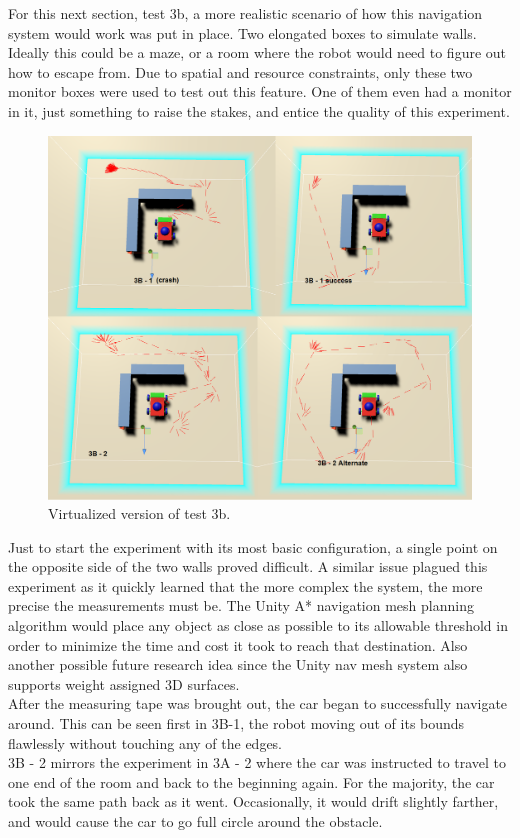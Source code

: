 \documentclass[10pt,a4paper]{article}
\begin{document}
	For this next section, test 3b, a more realistic scenario of how this navigation system would work was put in place. Two elongated boxes to simulate walls. Ideally this could be a maze, or a room where the robot would need to figure out how to escape from. Due to spatial and resource constraints, only these two monitor boxes were used to test out this feature. One of them even had a monitor in it, just something to raise the stakes, and entice the quality of this experiment.
	
	\begin{figure}
		\centering
		\includegraphics[width=.8\textwidth]{Test3_Visuals/Test3b_mosaic.png}
		\caption{Virtualized version of test 3b.}
		\label{fig:vis_comp_t3b}
	\end{figure}

	Just to start the experiment with its most basic configuration, a single point on the opposite side of the two walls proved difficult. A similar issue plagued this experiment as it quickly learned that the more complex the system, the more precise the measurements must be. The Unity A* navigation mesh planning algorithm would place any object as close as possible to its allowable threshold in order to minimize the time and cost it took to reach that destination. Also another possible future research idea since the Unity nav mesh system also supports weight assigned 3D surfaces.
	\\
	After the measuring tape was brought out, the car began to successfully navigate around. This can be seen first in 3B-1, the robot moving out of its bounds flawlessly without touching any of the edges.
	\\
	3B - 2 mirrors the experiment in 3A - 2 where the car was instructed to travel to one end of the room and back to the beginning again. For the majority, the car took the same path back as it went. Occasionally, it would drift slightly farther, and would cause the car to go full circle around the obstacle.
	
\end{document}
